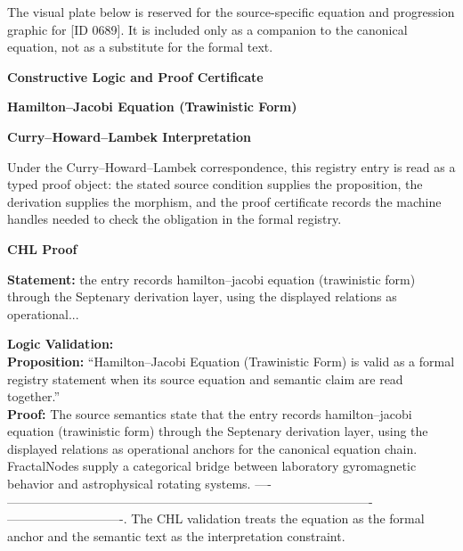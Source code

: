 \begingroup\footnotesize\sloppy
The visual plate below is reserved for the source-specific equation and progression graphic for [ID 0689]. It is included only as a companion to the canonical equation, not as a substitute for the formal text.
\par\endgroup
\ifTZPDarkEdition
{}
\fi

\clearpage
\begingroup\tzpsupportsetup
\noindent\textbf{\fontsize{10.8pt}{12.8pt}\selectfont [ID 0689] Constructive Logic and Proof Certificate}\par
\noindent\textbf{\fontsize{10pt}{12pt}\selectfont Hamilton--Jacobi Equation (Trawinistic Form)}\par
\vspace{0.45em}
\begingroup
\footnotesize
\setlength{\parskip}{0.22em}
\setlength{\parindent}{0pt}
\noindent\textbf{Curry--Howard--Lambek Interpretation}\par
Under the Curry--Howard--Lambek correspondence, this registry entry is read as a typed proof
object: the stated source condition supplies the proposition, the derivation supplies the
morphism, and the proof certificate records the machine handles needed to check the obligation
in the formal registry.

\vspace{0.45em}
\noindent\textbf{CHL Proof}\par
\textbf{Statement:} the entry records hamilton--jacobi equation (trawinistic form) through the Septenary
derivation layer, using the displayed relations as operational...

\textbf{Logic Validation:}\\
\textbf{Proposition:} ``Hamilton--Jacobi Equation (Trawinistic Form) is valid as a formal registry statement
when its source equation and semantic claim are read together.''\\
\textbf{Proof:} The source semantics state that the entry records hamilton--jacobi equation (trawinistic
form) through the Septenary derivation layer, using the displayed relations as
operational anchors for the canonical equation chain. FractalNodes supply a categorical
bridge between laboratory gyromagnetic behavior and astrophysical rotating systems. ----
----------------------------------------------------------------------------------------
----------------------------. The CHL validation treats the equation as the formal
anchor and the semantic text as the interpretation constraint.

